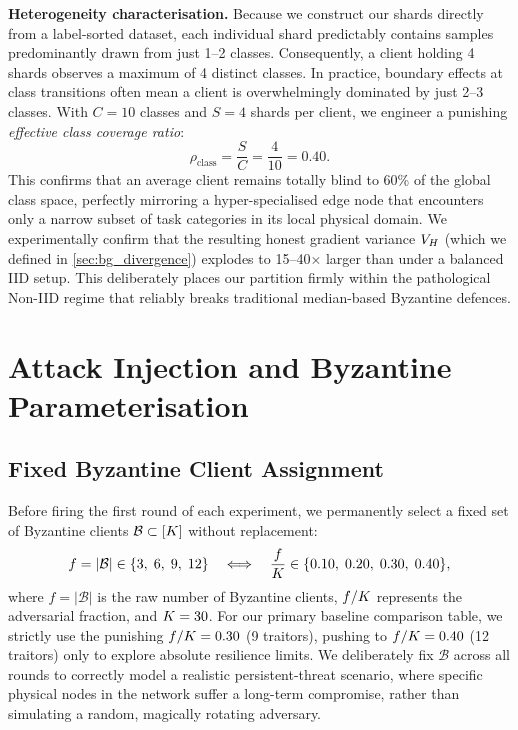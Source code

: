 \documentclass[../main.tex]{subfiles}
\begin{document}
\textbf{Heterogeneity characterisation.} Because we construct our shards directly from a label-sorted dataset, each individual shard predictably contains samples predominantly drawn from just 1--2 classes. Consequently, a client holding 4 shards observes a maximum of 4 distinct classes. In practice, boundary effects at class transitions often mean a client is overwhelmingly dominated by just 2--3 classes. With $C = 10$ classes and $S = 4$ shards per client, we engineer a punishing \emph{effective class coverage ratio}:
\begin{equation}
    \rho_{\text{class}} = \frac{S}{C} = \frac{4}{10} = 0.40.
    \label{eq:class_coverage}
\end{equation}
This confirms that an average client remains totally blind to 60\% of the global class space, perfectly mirroring a hyper-specialised edge node that encounters only a narrow subset of task categories in its local physical domain. We experimentally confirm that the resulting honest gradient variance $V_{H}$ (which we defined in \cref{sec:bg_divergence}) explodes to 15--40$\times$ larger than under a balanced IID setup. This deliberately places our partition firmly within the pathological Non-IID regime that reliably breaks traditional median-based Byzantine defences.

\section{Attack Injection and Byzantine Parameterisation}
\label{sec:exp_attacks}

\subsection{Fixed Byzantine Client Assignment}
\label{sec:exp_fixed_byz}

Before firing the first round of each experiment, we permanently select a fixed set of Byzantine clients $\mathcal{B} \subset [K]$ without replacement:
\begin{equation}
    f = |\mathcal{B}| \in \{3,\; 6,\; 9,\; 12\}
    \quad\Longleftrightarrow\quad
    \frac{f}{K} \in \{0.10,\; 0.20,\; 0.30,\; 0.40\},
    \label{eq:byz_fraction}
\end{equation}
where $f = |\mathcal{B}|$ is the raw number of Byzantine clients, $f/K$ represents the adversarial fraction, and $K = 30$. For our primary baseline comparison table, we strictly use the punishing $f/K = 0.30$ (9 traitors), pushing to $f/K = 0.40$ (12 traitors) only to explore absolute resilience limits. We deliberately fix $\mathcal{B}$ across all rounds to correctly model a realistic persistent-threat scenario, where specific physical nodes in the network suffer a long-term compromise, rather than simulating a random, magically rotating adversary.
\end{document}
